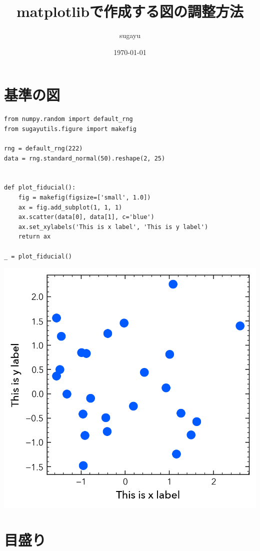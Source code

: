 \documentclass[a4paper, 10pt, notitlepage, twocolumn, uplatex, oneside, dvipdfmx]{jsarticle}
\author{sugayu}
\date{\today}
\title{\textbf{matplotlibで作成する図の調整方法}}
\begin{document}
\maketitle
\tableofcontents

\section{基準の図}
\label{sec:orgb804484}
\begin{verbatim}
from numpy.random import default_rng
from sugayutils.figure import makefig

rng = default_rng(222)
data = rng.standard_normal(50).reshape(2, 25)


def plot_fiducial():
    fig = makefig(figsize=['small', 1.0])
    ax = fig.add_subplot(1, 1, 1)
    ax.scatter(data[0], data[1], c='blue')
    ax.set_xylabels('This is x label', 'This is y label')
    return ax

_ = plot_fiducial()
\end{verbatim}

\begin{center}
\includegraphics[width=1.0\linewidth]{./obipy-resources/fiducial.png}
\end{center}
\section{目盛り}
\label{sec:org2344501}
\end{document}
